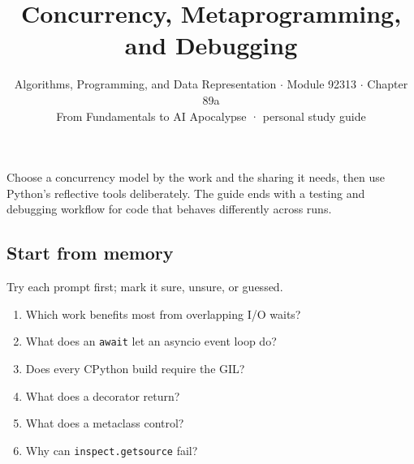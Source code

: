 \documentclass[11pt]{article}
\title{\sffamily\bfseries\color{FAUblue}Concurrency, Metaprogramming, and Debugging}
\author{Algorithms, Programming, and Data Representation \ensuremath{\cdot} Module 92313 \ensuremath{\cdot} Chapter 89a\\[2pt]\small From Fundamentals to AI Apocalypse · personal study guide}
\date{}
\begin{document}
\maketitle
\begingroup\footnotesize\setlength{\parskip}{0pt}\tableofcontents\endgroup
\clearpage

{\large Choose a concurrency model by the work and the sharing it needs, then use Python’s reflective tools deliberately. The guide ends with a testing and debugging workflow for code that behaves differently across runs.}


\begin{keepsection}
\section{Start from memory}

Try each prompt first; mark it sure, unsure, or guessed.

\begin{enumerate}
\item Which work benefits most from overlapping I/O waits?
\item What does an \texttt{await} let an asyncio event loop do?
\item Does every CPython build require the GIL?
\item What does a decorator return?
\item What does a metaclass control?
\item Why can \texttt{inspect.getsource} fail?
\end{enumerate}

\end{keepsection}
\end{document}
